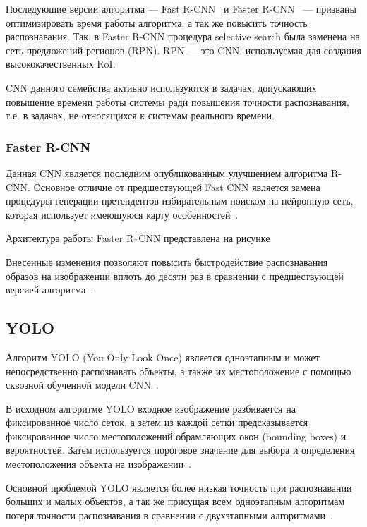 Последующие версии алгоритма --- Fast R-CNN~\cite{fast-r-cnn} и Faster R-CNN~\cite{faster-r-cnn} --- призваны оптимизировать время работы алгоритма, а так же повысить точность распознавания. Так, в Faster R-CNN процедура selective search была заменена на сеть предложений регионов (RPN). RPN --- это CNN, используемая для создания высококачественных RoI.

CNN данного семейства активно используются в задачах, допускающих повышение времени работы системы ради повышения точности распознавания, т.е. в задачах, не относящихся к системам реального времени.

\subsubsection{Faster R-CNN}

Данная CNN является последним опубликованным улучшением алгоритма R-CNN. Основное отличие от предшествующей Fast CNN является замена процедуры генерации претендентов избирательным поиском на нейронную сеть, которая использует имеющуюся карту особенностей~\cite{faster-r-cnn}.

Архитектура работы Faster R–CNN представлена на рисунке


Внесенные изменения позволяют повысить быстродействие распознавания образов на изображении вплоть до десяти раз в сравнении с предшествующей версией алгоритма~\cite{faster-r-cnn}.

\subsection{YOLO}

Алгоритм YOLO (You Only Look Once) является одноэтапным и может непосредственно распознавать объекты, а также их местоположение с помощью сквозной обученной модели CNN~\cite{yolo-review}.

В исходном алгоритме YOLO входное изображение разбивается на фиксированное число сеток, а затем из каждой сетки предсказывается фиксированное число местоположений обрамляющих окон (bounding boxes) и вероятностей. Затем используется пороговое значение для выбора и определения местоположения объекта на изображении~\cite{yolo-review}.

Основной проблемой YOLO является более низкая точность при распознавании больших и малых объектов, а так же присущая всем одноэтапным алгоритмам потеря точности распознавания в сравнении с двухэтапными алгоритмами~\cite{yolo-review}.

